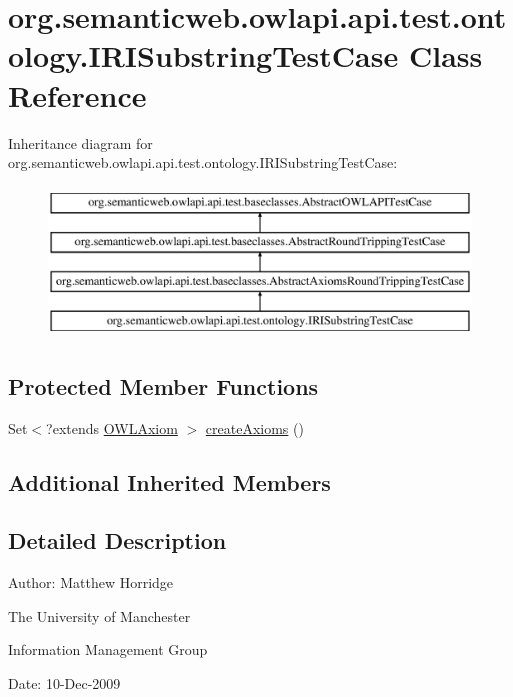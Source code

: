 \hypertarget{classorg_1_1semanticweb_1_1owlapi_1_1api_1_1test_1_1ontology_1_1_i_r_i_substring_test_case}{\section{org.\-semanticweb.\-owlapi.\-api.\-test.\-ontology.\-I\-R\-I\-Substring\-Test\-Case Class Reference}
\label{classorg_1_1semanticweb_1_1owlapi_1_1api_1_1test_1_1ontology_1_1_i_r_i_substring_test_case}
}
Inheritance diagram for org.\-semanticweb.\-owlapi.\-api.\-test.\-ontology.\-I\-R\-I\-Substring\-Test\-Case\-:\begin{figure}[H]
\begin{center}
\leavevmode
\includegraphics[height=4.000000cm]{classorg_1_1semanticweb_1_1owlapi_1_1api_1_1test_1_1ontology_1_1_i_r_i_substring_test_case}
\end{center}
\end{figure}
\subsection*{Protected Member Functions}
\begin{DoxyCompactItemize}
\item 
Set$<$?extends \hyperlink{interfaceorg_1_1semanticweb_1_1owlapi_1_1model_1_1_o_w_l_axiom}{O\-W\-L\-Axiom} $>$ \hyperlink{classorg_1_1semanticweb_1_1owlapi_1_1api_1_1test_1_1ontology_1_1_i_r_i_substring_test_case_ae27789f1d762890ac4b0d5fb11e45539}{create\-Axioms} ()
\end{DoxyCompactItemize}
\subsection*{Additional Inherited Members}


\subsection{Detailed Description}
Author\-: Matthew Horridge\par
 The University of Manchester\par
 Information Management Group\par
 Date\-: 10-\/\-Dec-\/2009 

